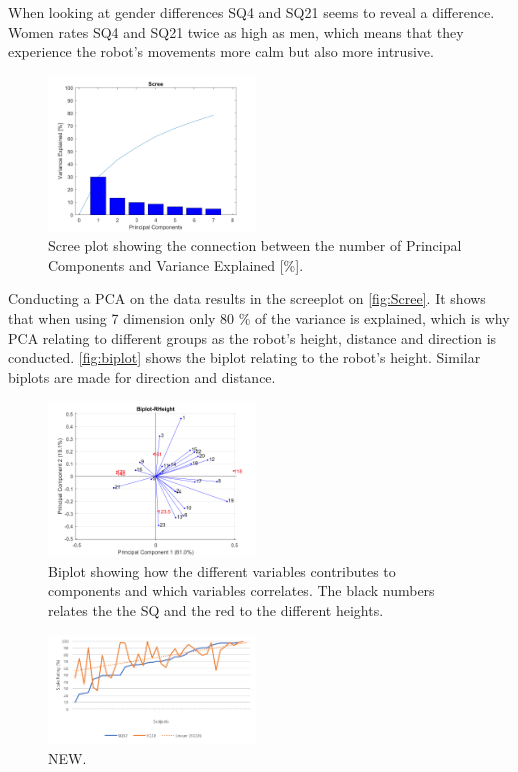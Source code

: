 When looking at gender differences SQ4 and SQ21 seems to reveal a difference. Women rates SQ4 and SQ21 twice as high as men, which means that they experience the robot's movements more calm but also more intrusive.
%
\begin{figure}[H]
	\centering
	\includegraphics[width = 0.49\textwidth]{Figure/Scree.png}
	\setlength{} 
	\caption{Scree plot showing the connection between the number of Principal Components and Variance Explained [\%].}
	\label{fig:Scree}
\end{figure}
\noindent
%
Conducting a PCA on the data results in the screeplot on \autoref{fig:Scree}. It shows that when using 7 dimension only 80 \% of the variance is explained, which is why PCA relating to different groups as the robot's height, distance and direction is conducted. \autoref{fig:biplot} shows the biplot relating to the robot's height. Similar biplots are made for direction and distance. 
%
\begin{figure}[H]
	\centering
	\includegraphics[width = 0.49\textwidth]{Figure/RHeight-Biplot.png}
	\setlength{} 
	\caption{Biplot showing how the different variables contributes to components and which variables correlates. The black numbers relates the the SQ and the red to the different heights.}
	\label{fig:biplot}
\end{figure}
\noindent
%
%
\begin{figure}[H]
	\centering
	\includegraphics[width = 0.49\textwidth]{Figure/SQ12+SQ18}
	\setlength{} 
	\caption{NEW.}
	\label{fig:SQ12+SQ18}
\end{figure}
